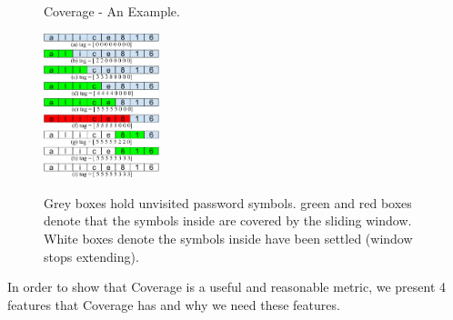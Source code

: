 \begin{figure}[h!]
\centering
  \caption{Coverage - An Example.}{}
  \label{f1}
  \centering
    \includegraphics[width=0.3\textwidth]{fig/cvgfig}
\caption*{Grey boxes hold unvisited password symbols. green and red boxes denote that the symbols inside are covered by the sliding window. White boxes denote the symbols inside have been settled (window stops extending). }

\end{figure}


In order to show that Coverage is a useful and reasonable metric, we present 4 features that Coverage has and why we need these features.

